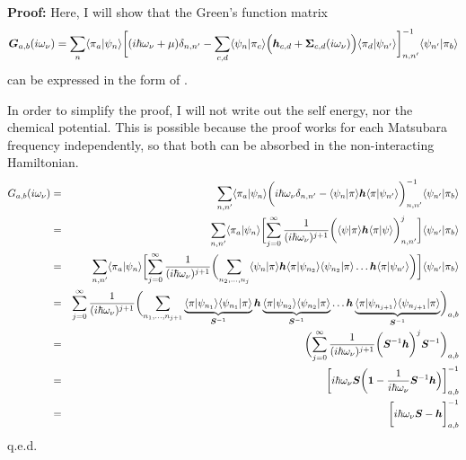 \documentclass[11pt,a4paper]{report}
\begin{document}
\textbf{Proof:}
Here, I will show that the Green's function matrix 
\begin{eqnarray}
\bm{G}_{a,b}(i\omega_\nu)=
\sum_n\langle\pi_a|\psi_n\rangle
\biggl[
(i\hbar\omega_\nu+\mu)\delta_{n,n'}-
\sum_{c,d}\langle\psi_n|\pi_c\rangle
\Bigl(\bm{h}_{c,d}+\bm{\Sigma}_{c,d}(i\omega_\nu)\Bigr)
\langle\pi_d|\psi_{n'}\rangle
\biggr]^{-1}_{n,n'}
\langle\psi_{n'}|\pi_b\rangle
\nonumber\\
\label{eq:greenlocform2}
\end{eqnarray}
can be expressed in the form of .

In order to simplify the proof, I will not write out the self energy,
nor the chemical potential. This is possible because the proof works
for each Matsubara frequency independently, so that both can be
absorbed in the non-interacting Hamiltonian.
\begin{eqnarray}
G_{a,b}(i\omega_\nu)
&=&
\sum_{n,n'}\langle\pi_a|\psi_{n}\rangle
\biggl(i\hbar\omega_\nu\delta_{n,n'}
-
\langle\psi_n|\pi\rangle
\bm{h}
\langle\pi|\psi_{n'}\rangle\biggr)^{-1}_{n,n'}
\langle\psi_{n'}|\pi_b\rangle
\nonumber\\
&=&
\sum_{n,n'}\langle\pi_a|\psi_{n}\rangle
\biggl[
\sum_{j=0}^\infty
\frac{1}{(i\hbar\omega_\nu)^{j+1}}
\biggl(
\langle\psi|\pi\rangle
\bm{h}
\langle\pi|\psi\rangle\biggr)^j_{n,n'}
\biggr]\langle\psi_{n'}|\pi_b\rangle
\nonumber\\
&=&
\sum_{n,n'}\langle\pi_a|\psi_{n}\rangle
\biggl[
\sum_{j=0}^\infty
\frac{1}{(i\hbar\omega_\nu)^{j+1}}
\biggl(\sum_{n_2,\ldots,n_{j}} 
\langle\psi_{n}|\pi\rangle
\bm{h}
\langle\pi|\psi_{n_2}\rangle\langle\psi_{n_2}|\pi\rangle
\ldots
\bm{h}
\langle\pi|\psi_{n'}\rangle\biggr)\biggr]
\langle\psi_{n'}|\pi_b\rangle
\nonumber\\
&=&
\sum_{j=0}^\infty\frac{1}{(i\hbar\omega_\nu)^{j+1}}
\biggl(\sum_{n_1,\ldots,n_{j+1}} 
\underbrace{\langle\pi|\psi_{n_1}\rangle
\langle\psi_{n_1}|\pi\rangle}_{\bm{S}^{-1}}
\bm{h}
\underbrace{\langle\pi|\psi_{n_2}\rangle\langle\psi_{n_2}|\pi\rangle}_{\bm{S}^{-1}}
\ldots
\bm{h}
\underbrace{\langle\pi|\psi_{n_{j+1}}\rangle
\langle\psi_{n_{j+1}}|\pi\rangle}_{\bm{S}^{-1}}
\biggr)_{a,b}
\nonumber\\
&=&
\biggl(\sum_{j=0}^\infty\frac{1}{(i\hbar\omega_\nu)^{j+1}}
\biggl(\bm{S}^{-1}\bm{h}\biggr)^{j}\bm{S}^{-1}\biggr)_{a,b}
\nonumber\\
&=&\biggl[i\hbar\omega_\nu\bm{S}\biggl
(\bm{1}-\frac{1}{i\hbar\omega_\nu}\bm{S}^{-1}\bm{h}\Bigr)\biggr]^{-1}_{a,b}
\nonumber\\
&=&\biggl[i\hbar\omega_\nu\bm{S}-\bm{h}\biggr]^{-1}_{a,b}
\end{eqnarray}
q.e.d.
\end{document}
